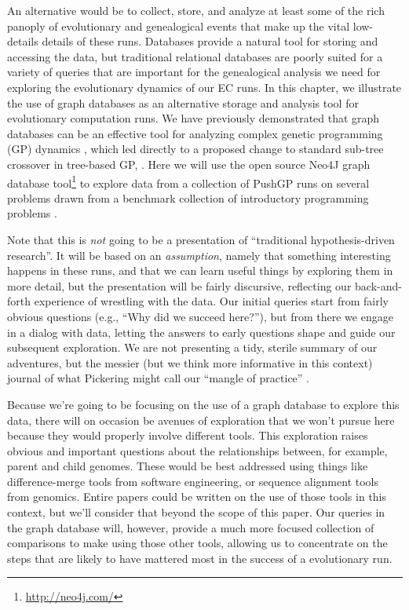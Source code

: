 An alternative would be to collect, store, and analyze at least some of the rich panoply of 
evolutionary and genealogical events that make up the vital low-details details of these runs. 
Databases provide a natural tool for 
storing and accessing the data, but traditional relational
databases are poorly suited for a variety of queries that are important for the genealogical analysis
we need for exploring the evolutionary dynamics of our EC runs.
In this chapter, we illustrate the use of graph databases as an alternative storage and analysis tool for
evolutionary computation runs. We have previously demonstrated that graph databases
can be an effective tool for analyzing complex genetic programming (GP) dynamics \citep{donatuccianalysis}, which led directly
to a proposed change to standard sub-tree crossover in tree-based GP, \citep{mcphee:GECCO15}.
Here we will use the open source Neo4J graph database tool\footnote{\url{http://neo4j.com/}} 
to explore data from a
collection of PushGP runs on several problems drawn from a benchmark collection of introductory 
programming problems \citep{Helmuth:2015:GECCO}.

Note that this is \emph{not} going to be a presentation of ``traditional hypothesis-driven 
research''. It will be based on an \emph{assumption}, namely that something interesting happens in
these runs, and that we can learn useful things by exploring them in more detail, but the presentation
will be fairly discursive, reflecting our back-and-forth experience of wrestling with the data. Our
initial queries start from fairly obvious questions (e.g., ``Why did we succeed here?''), but from
there we engage in a dialog with data, letting the answers to early questions shape and guide our 
subsequent exploration. We are not presenting a tidy, sterile summary of our adventures, but
the messier (but we think more informative in this context) journal of what Pickering might call
our ``mangle of practice'' \citep{smith2008mangle, pickering:AJS:1993}.

Because we're going to be focusing on the use of a graph database to explore this data, there will
on occasion be avenues of exploration that we won't pursue here because they would properly involve
different tools. This exploration raises obvious and important questions about the relationships between,
for example, parent and child genomes. These would be best addressed using things like 
difference-merge tools from software engineering, or sequence alignment tools from genomics.
Entire papers could be written on the use of those tools in this context, but we'll consider that
beyond the scope of this paper. Our queries in the graph database will, however, provide a much more 
focused collection of comparisons to make using those other tools, allowing us to concentrate on the
steps that are likely to have mattered most in the success of a evolutionary run.

